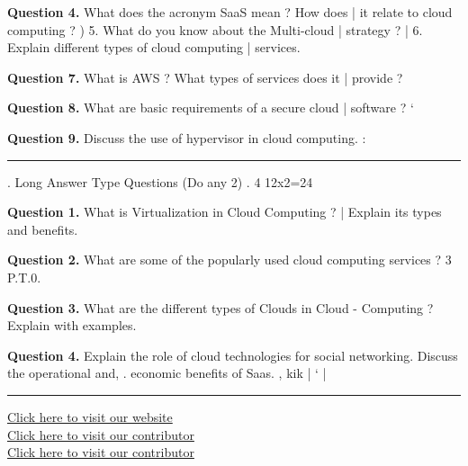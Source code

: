 \documentclass[11pt,a4paper]{article}
\begin{document}
\medskip\noindent\textbf{Question 4.} What does the acronym SaaS mean ? How does
| it relate to cloud computing ?
) 5. What do you know about the Multi-cloud
| strategy ?
| 6. Explain different types of cloud computing
| services.

\medskip\noindent\textbf{Question 7.} What is AWS ? What types of services does it
| provide ?

\medskip\noindent\textbf{Question 8.} What are basic requirements of a secure cloud
| software ? ‘

\medskip\noindent\textbf{Question 9.} Discuss the use of hypervisor in cloud
computing. :

\bigskip{}
\rule{\linewidth}{0.4pt}\smallskip

. Long Answer Type Questions (Do any 2)
. 4 12x2=24

\medskip\noindent\textbf{Question 1.} What is Virtualization in Cloud Computing ?
| Explain its types and benefits.

\medskip\noindent\textbf{Question 2.} What are some of the popularly used cloud
computing services ?
3 P.T.0.

\medskip\noindent\textbf{Question 3.} What are the different types of Clouds in Cloud -
Computing ? Explain with examples.

\medskip\noindent\textbf{Question 4.} Explain the role of cloud technologies for social
networking. Discuss the operational and,
. economic benefits of Saas.
, kik |
‘ |

\vfill
\rule{\linewidth}{0.4pt}
\begin{center}\small
\href{https://bhu-exam.vercel.app/}{Click here to visit our website}\\[4pt]\href{https://me-aryan.vercel.app/}{Click here to visit our contributor}\\[4pt]\href{https://quashan-me.vercel.app/}{Click here to visit our contributor}
\end{center}
\end{document}
